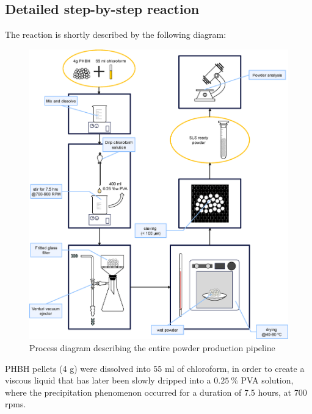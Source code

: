 \documentclass{article}
\begin{document}
        \subsection{Detailed step-by-step reaction\label{detailed_reaction}}

        The reaction is shortly described by the following diagram: 

            \begin{figure}[h!]
                \centering
                \includegraphics[width=\textwidth]{Pictures/process_diagram.eps}
                \caption{Process diagram describing the entire powder production pipeline \autocite{Inkscape}}
                \label{fig:process_diagram}
            \end{figure}

        \clearpage

        PHBH pellets (4 g) were dissolved into 55 ml of chloroform, in order to create a viscous liquid that has later been slowly dripped into a 
        $0.25 \ \%$ PVA solution, where the precipitation phenomenon occurred for a duration of 7.5 hours, at 700 rpms. \\ 

        
\end{document}
